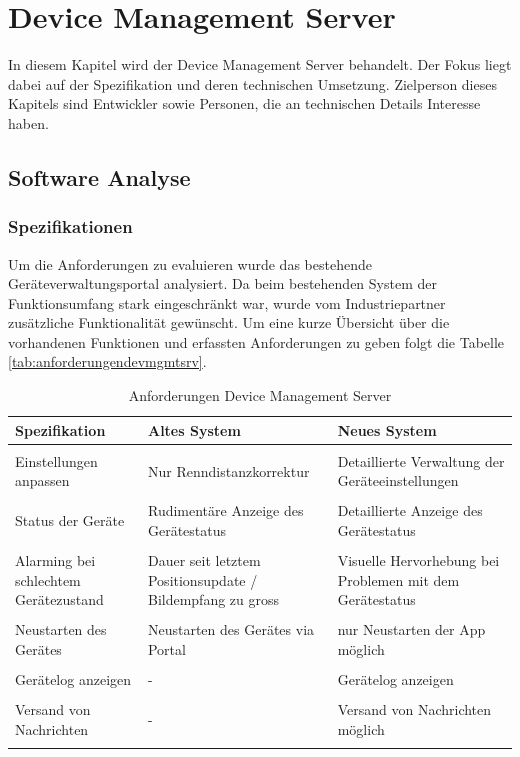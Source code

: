\chapter{Device Management Server}
\label{sec:devmgmtsrv}
In diesem Kapitel wird der Device Management Server behandelt. Der Fokus liegt dabei auf der Spezifikation und deren technischen Umsetzung. Zielperson dieses Kapitels sind Entwickler sowie Personen, die an technischen Details Interesse haben.

\section{Software Analyse}

\subsection{Spezifikationen}
Um die Anforderungen zu evaluieren wurde das bestehende Geräteverwaltungsportal analysiert. Da beim bestehenden System der Funktionsumfang stark eingeschränkt war, wurde vom Industriepartner zusätzliche Funktionalität gewünscht.
Um eine kurze Übersicht über die vorhandenen Funktionen und erfassten Anforderungen zu geben folgt die Tabelle \ref{tab:anforderungendevmgmtsrv}.

\begin{longtable}{  p{3.5cm} | p{4.3cm} | p{4.3cm} }

    \textbf{Spezifikation} & \textbf{Altes System} & \textbf{Neues System} \\ [1ex] \hline \hline & &  \\ [-1.5ex]
    Einstellungen anpassen & Nur Renndistanzkorrektur & Detaillierte Verwaltung der Geräteeinstellungen\\ [1ex] \hline & &  \\ [-1.5ex]
    Status der Geräte & Rudimentäre Anzeige des Gerätestatus & Detaillierte Anzeige des Gerätestatus\\ [1ex] \hline & &  \\ [-1.5ex]
     Alarming bei schlechtem Gerätezustand & Dauer seit letztem Positionsupdate / Bildempfang zu gross & Visuelle Hervorhebung bei Problemen mit dem Gerätestatus \\ [1ex] \hline & &  \\ [-1.5ex]
    Neustarten des Gerätes & Neustarten des Gerätes via Portal & nur Neustarten der App möglich\\ [1ex] \hline & &  \\ [-1.5ex]
    Gerätelog anzeigen & - & Gerätelog anzeigen\\ [1ex] \hline & &  \\ [-1.5ex]
    Versand von Nachrichten & - & Versand von Nachrichten möglich\\ [1ex] 
\caption{Anforderungen Device Management Server}
\end{longtable}
\label{tab:anforderungendevmgmtsrv}

